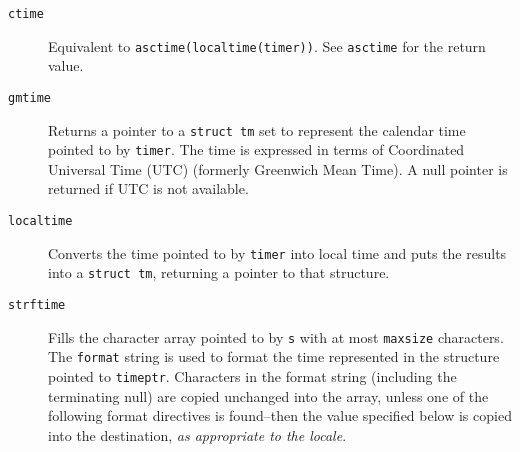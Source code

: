 \begin{description}
   

   \item[\texttt{ctime}] Equivalent to \texttt{asctime(localtime(timer))}.  See
    \texttt{asctime} for the return value.

   \item[\texttt{gmtime}] Returns a pointer to a \texttt{struct tm}  set  to  represent  the
    calendar time pointed to by \texttt{timer}.  The time is expressed in
    terms of Coordinated Universal  Time  (UTC)  (formerly Greenwich  Mean
    Time).  A null pointer is returned if UTC is not available.

   \item[\texttt{localtime}] Converts the time pointed to by \texttt{timer} into local time and
    puts the results into a \texttt{struct tm}, returning a pointer to that
    structure.

   \item[\texttt{strftime}] 
    Fills the character array pointed to by \texttt{s}  with  at  most
     \texttt{maxsize}  characters.  The \texttt{format} string is used
     to format the time represented in the structure pointed to
     \texttt{timeptr}.  Characters   in   the   format   string
     (including  the terminating null) are copied unchanged  into  the  array,
     unless  one of the following format directives is found--then the
     value  specified  below  is  copied  into  the destination, \textit{as
     appropriate to the locale}.



\end{description}
